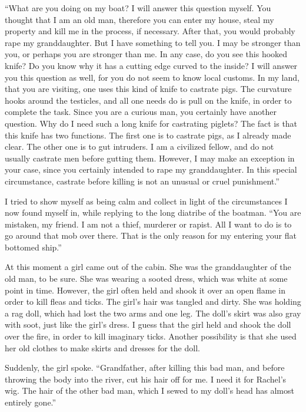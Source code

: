 \documentclass[
  12pt,
]{book}
\begin{document}
``What are you doing on my boat? I will answer this question myself. You
thought that I am an old man, therefore you can enter my house, steal my
property and kill me in the process, if necessary. After that, you would
probably rape my granddaughter. But I have something to tell you. I may
be stronger than you, or perhaps you are stronger than me. In any case,
do you see this hooked knife? Do you know why it has a cutting edge
curved to the inside? I will answer you this question as well, for you
do not seem to know local customs. In my land, that you are visiting,
one uses this kind of knife to castrate pigs. The curvature hooks around
the testicles, and all one needs do is pull on the knife, in order to
complete the task. Since you are a curious man, you certainly have
another question. Why do I need such a long knife for castrating
piglets? The fact is that this knife has two functions. The first one is
to castrate pigs, as I already made clear. The other one is to gut
intruders. I am a civilized fellow, and do not usually castrate men
before gutting them. However, I may make an exception in your case,
since you certainly intended to rape my granddaughter. In this special
circumstance, castrate before killing is not an unusual or cruel
punishment.''

I tried to show myself as being calm and collect in light of the
circumstances I now found myself in, while replying to the long diatribe
of the boatman. ``You are mistaken, my friend. I am not a thief,
murderer or rapist. All I want to do is to go around that mob over
there. That is the only reason for my entering your flat bottomed
ship.''

At this moment a girl came out of the cabin. She was the granddaughter
of the old man, to be sure. She was wearing a sooted dress, which was
white at some point in time. However, the girl often held and shook it
over an open flame in order to kill fleas and ticks. The girl's hair was
tangled and dirty. She was holding a rag doll, which had lost the two
arms and one leg. The doll's skirt was also gray with soot, just like
the girl's dress. I guess that the girl held and shook the doll over the
fire, in order to kill imaginary ticks. Another possibility is that she
used her old clothes to make skirts and dresses for the doll.

Suddenly, the girl spoke. ``Grandfather, after killing this bad man, and
before throwing the body into the river, cut his hair off for me. I need
it for Rachel's wig. The hair of the other bad man, which I sewed to my
doll's head has almost entirely gone.''
\end{document}
